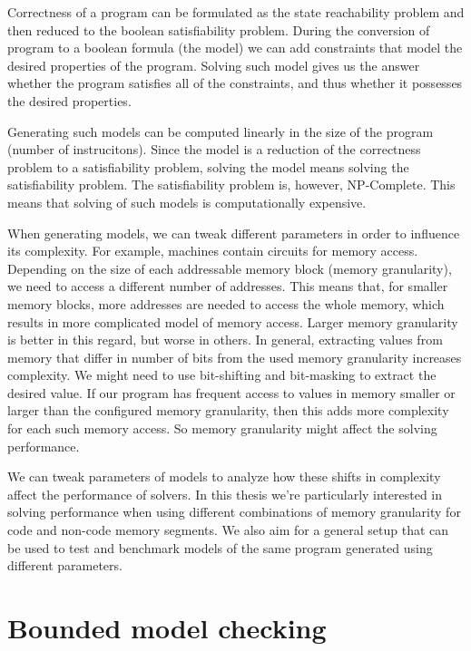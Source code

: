 \documentclass[12pt]{article}
\begin{document}
Correctness of a program can be formulated as the state reachability problem
and then reduced to the boolean satisfiability problem. During the conversion
of program to a boolean formula (the model) we can add constraints that model
the desired properties of the program. Solving such model gives us the answer
whether the program satisfies all of the constraints, and thus whether it
possesses the desired properties. 

Generating such models can be computed linearly in the size of the program
(number of instrucitons). Since the model is a reduction of the correctness
problem to a satisfiability problem, solving the model means solving the
satisfiability problem. The satisfiability problem is, however, NP-Complete.
This means that solving of such models is computationally expensive. 

When generating models, we can tweak different parameters in order to influence
its complexity. For example, machines contain circuits for memory access.
Depending on the size of each addressable memory block (memory granularity), we
need to access a different number of addresses. This means that, for smaller
memory blocks, more addresses are needed to access the whole memory, which
results in more complicated model of memory access. Larger memory granularity
is better in this regard, but worse in others. In general, extracting values
from memory that differ in number of bits from the used memory granularity
increases complexity. We might need to use bit-shifting and bit-masking to
extract the desired value. If our program has frequent access to values in
memory smaller or larger than the configured memory granularity, then this adds
more complexity for each such memory access. So memory granularity might affect
the solving performance.

We can tweak parameters of models to analyze how these shifts in complexity
affect the performance of solvers. In this thesis we're particularly
interested in solving performance when using different combinations of memory
granularity for code and non-code memory segments. We also aim for a general
setup that can be used to test and benchmark models of the same program
generated using different parameters. 

\newpage

\section{Bounded model checking}
\end{document}
